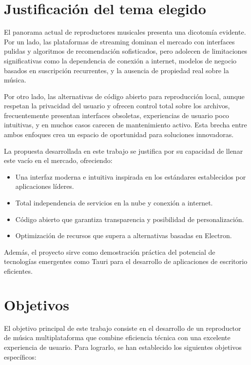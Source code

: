 \documentclass[11pt, a4paper]{article}
\begin{document}
\section{Justificación del tema elegido}

El panorama actual de reproductores musicales presenta una dicotomía evidente. Por un lado, las plataformas de streaming dominan el mercado con interfaces pulidas y algoritmos de recomendación sofisticados, pero adolecen de limitaciones significativas como la dependencia de conexión a internet, modelos de negocio basados en suscripción recurrentes, y la ausencia de propiedad real sobre la música. 

Por otro lado, las alternativas de código abierto para reproducción local, aunque respetan la privacidad del usuario y ofrecen control total sobre los archivos, frecuentemente presentan interfaces obsoletas, experiencias de usuario poco intuitivas, y en muchos casos carecen de mantenimiento activo. Esta brecha entre ambos enfoques crea un espacio de oportunidad para soluciones innovadoras.

La propuesta desarrollada en este trabajo se justifica por su capacidad de llenar este vacío en el mercado, ofreciendo:
\begin{itemize}
    \item Una interfaz moderna e intuitiva inspirada en los estándares establecidos por aplicaciones líderes.
    \item Total independencia de servicios en la nube y conexión a internet.
    \item Código abierto que garantiza transparencia y posibilidad de personalización.
    \item Optimización de recursos que supera a alternativas basadas en Electron.
\end{itemize}

Además, el proyecto sirve como demostración práctica del potencial de tecnologías emergentes como Tauri para el desarrollo de aplicaciones de escritorio eficientes.

\section{Objetivos}

El objetivo principal de este trabajo consiste en el desarrollo de un reproductor de música multiplataforma que combine eficiencia técnica con una excelente experiencia de usuario. Para lograrlo, se han establecido los siguientes objetivos específicos:
\end{document}
